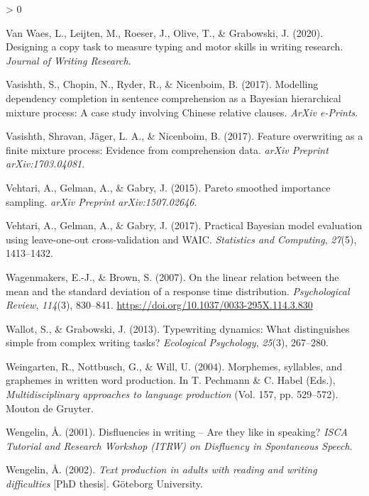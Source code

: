 \documentclass[
  english,
  man,mask,floatsintext]{apa7}
\newlength{\cslhangindent}
\newenvironment{CSLReferences}[2] %
 {%
  \setlength{\parindent}{0pt}
  \ifodd #1 \everypar{\setlength{\hangindent}{\cslhangindent}}\ignorespaces\fi
  \ifnum #2 > 0
  \setlength{\parskip}{#2\baselineskip}
  \fi
 }%
 {}
\begin{document}
\begin{CSLReferences}{1}{0}
\leavevmode\hypertarget{ref-waes2019}{}%
Van Waes, L., Leijten, M., Roeser, J., Olive, T., \& Grabowski, J. (2020). Designing a copy task to measure typing and motor skills in writing research. \emph{Journal of Writing Research}.

\leavevmode\hypertarget{ref-vasishth2017}{}%
Vasishth, S., Chopin, N., Ryder, R., \& Nicenboim, B. (2017). Modelling dependency completion in sentence comprehension as a {B}ayesian hierarchical mixture process: {A} case study involving {C}hinese relative clauses. \emph{ArXiv e-Prints}.

\leavevmode\hypertarget{ref-vasishth2017feature}{}%
Vasishth, Shravan, Jäger, L. A., \& Nicenboim, B. (2017). Feature overwriting as a finite mixture process: Evidence from comprehension data. \emph{arXiv Preprint arXiv:1703.04081}.

\leavevmode\hypertarget{ref-vehtari2015pareto}{}%
Vehtari, A., Gelman, A., \& Gabry, J. (2015). Pareto smoothed importance sampling. \emph{arXiv Preprint arXiv:1507.02646}.

\leavevmode\hypertarget{ref-vehtari2017practical}{}%
Vehtari, A., Gelman, A., \& Gabry, J. (2017). Practical {B}ayesian model evaluation using leave-one-out cross-validation and {WAIC}. \emph{Statistics and Computing}, \emph{27}(5), 1413--1432.

\leavevmode\hypertarget{ref-wagenmakers2007linear}{}%
Wagenmakers, E.-J., \& Brown, S. (2007). On the linear relation between the mean and the standard deviation of a response time distribution. \emph{Psychological Review}, \emph{114}(3), 830--841. \url{https://doi.org/10.1037/0033-295X.114.3.830}

\leavevmode\hypertarget{ref-wallot2013typewriting}{}%
Wallot, S., \& Grabowski, J. (2013). Typewriting dynamics: What distinguishes simple from complex writing tasks? \emph{Ecological Psychology}, \emph{25}(3), 267--280.

\leavevmode\hypertarget{ref-wei04}{}%
Weingarten, R., Nottbusch, G., \& Will, U. (2004). Morphemes, syllables, and graphemes in written word production. In T. Pechmann \& C. Habel (Eds.), \emph{Multidisciplinary approaches to language production} (Vol. 157, pp. 529--572). Mouton de Gruyter.

\leavevmode\hypertarget{ref-wengelin2001disfluencies}{}%
Wengelin, Å. (2001). Disfluencies in writing -- {A}re they like in speaking? \emph{{ISCA} Tutorial and Research Workshop ({ITRW}) on Disfluency in Spontaneous Speech}.

\leavevmode\hypertarget{ref-wen02}{}%
Wengelin, Å. (2002). \emph{Text production in adults with reading and writing difficulties} {[}PhD thesis{]}. Göteborg University.


\end{CSLReferences}
\end{document}
